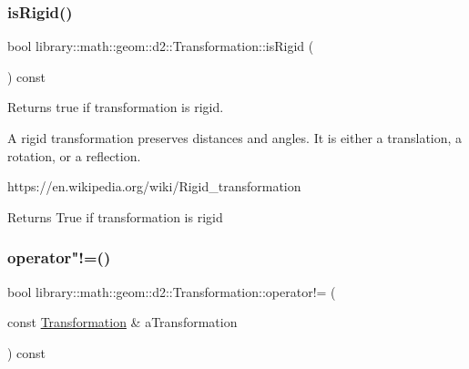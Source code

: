 \mbox{\label{classlibrary_1_1math_1_1geom_1_1d2_1_1_transformation_af30ebcdee91e0bc20d6b87557cd80111}} 
\subsubsection{\texorpdfstring{is\+Rigid()}{isRigid()}}
{\footnotesize\ttfamily bool library\+::math\+::geom\+::d2\+::\+Transformation\+::is\+Rigid (\begin{DoxyParamCaption}{ }\end{DoxyParamCaption}) const}



Returns true if transformation is rigid. 

A rigid transformation preserves distances and angles. It is either a translation, a rotation, or a reflection.

https\+://en.wikipedia.\+org/wiki/\+Rigid\+\_\+transformation

\begin{DoxyReturn}{Returns}
True if transformation is rigid 
\end{DoxyReturn}
\mbox{\label{classlibrary_1_1math_1_1geom_1_1d2_1_1_transformation_a0bed1d102c4ae75658866188efad2adb}} 
\subsubsection{\texorpdfstring{operator"!=()}{operator!=()}}
{\footnotesize\ttfamily bool library\+::math\+::geom\+::d2\+::\+Transformation\+::operator!= (\begin{DoxyParamCaption}\item[{const \hyperlink{classlibrary_1_1math_1_1geom_1_1d2_1_1_transformation}{Transformation} \&}]{a\+Transformation }\end{DoxyParamCaption}) const}

